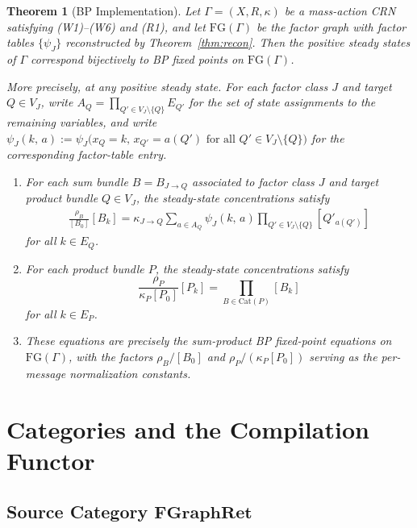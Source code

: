 \documentclass{article}
\theoremstyle{plain}
\newtheorem{theorem}{Theorem}[section]
\theoremstyle{definition}
\theoremstyle{remark}
\newcommand{\Cat}{\textrm{Cat}}
\newcommand{\<}{\langle}
\renewcommand{\>}{\rangle}
\begin{document}
\begin{theorem}[BP Implementation]\label{thm:BP-implementation}
Let $\Gamma = (X, R, \kappa)$ be a mass-action CRN satisfying \emph{(W1)--(W6)} and \emph{(R1)}, 
and let $\mathrm{FG}(\Gamma)$ be the factor graph with factor tables $\{\psi_J\}$ reconstructed 
by Theorem~\ref{thm:recon}. Then the positive steady states of $\Gamma$ correspond 
bijectively to BP fixed points on $\mathrm{FG}(\Gamma)$.

More precisely, at any positive steady state. For each factor class $J$ and 
target $Q \in V_J$, write $A_Q = \prod_{Q' \in V_J \setminus \{Q\}} E_{Q'}$ 
for the set of state assignments to the remaining variables, and write 
$\psi_J(k,\, a) := \psi_J\bigl(x_Q = k,\, x_{Q'} = a(Q') \text{ for all } 
Q' \in V_J \setminus \{Q\}\bigr)$ for the corresponding factor-table entry.

\begin{enumerate}
\item For each sum bundle $B = B_{J \to Q}$ associated to factor class $J$ and 
target product bundle $Q \in V_J$, the steady-state concentrations satisfy
\begin{align}\label{eq:sum-steady}
\frac{\rho_B}{[B_0]}[B_k] 
= \kappa_{J \to Q} 
\sum_{a \in A_Q} 
\psi_J(k,\, a)
\prod_{Q' \in V_J\setminus\{Q\}} [Q'_{a(Q')}]
\end{align}
for all $k \in E_Q$.

\item For each product bundle $P$, the steady-state concentrations satisfy
\begin{equation}\label{eq:prod-steady}
\frac{\rho_P}{\kappa_P [P_0]}[P_k] = \prod_{B \in \Cat(P)} [B_k]
\end{equation}
for all $k \in E_P$.

\item These equations are precisely the sum-product BP fixed-point equations on 
$\mathrm{FG}(\Gamma)$, with the factors $\rho_B/[B_0]$ and $\rho_P/(\kappa_P[P_0])$ 
serving as the per-message normalization constants.
\end{enumerate}
\end{theorem}

\section{Categories and the Compilation Functor}\label{sec:categories}

\subsection{Source Category $\mathbf{FGraphRet}$}
\end{document}
